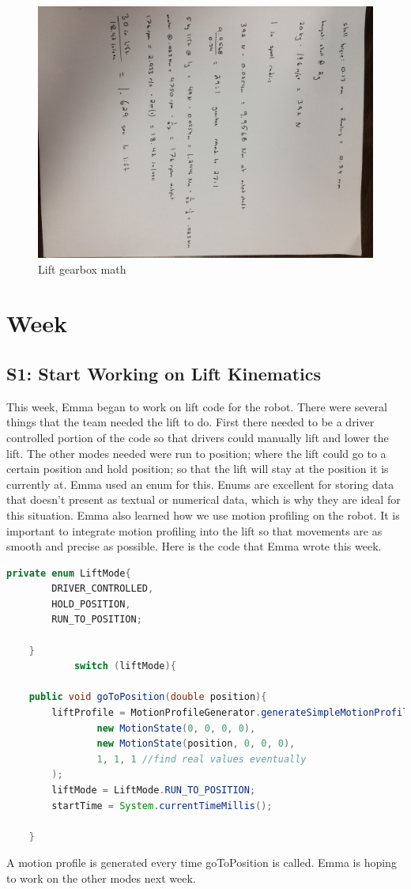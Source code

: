 \documentclass{article}
\begin{document}
\begin{figure}
    \centering
    \includegraphics[width=\textwidth, angle=90]{04_09-24/images/math.jpg}
    \caption{Lift gearbox math}
    \label{fig:my_label}
\end{figure}
\clearpage \newpage \section{Week \thesection} 
\subsection{S1: Start Working on Lift Kinematics}

This week, Emma began to work on lift code for the robot. There were several things that the team needed the lift to do. First there needed to be a driver controlled portion of the code so that drivers could manually lift and lower the lift. The other modes needed were run to position; where the lift could go to a certain position and hold position; so that the lift will stay at the position it is currently at. Emma used an enum for this. Enums are excellent for storing data that doesn't present as textual or numerical data, which is why they are ideal for this situation. Emma also learned how we use motion profiling on the robot. It is important to integrate motion profiling into the lift so that movements are as smooth and precise as possible. Here is the code that Emma wrote this week.
\begin{lstlisting}[language=Java]
    private enum LiftMode{
        DRIVER_CONTROLLED,
        HOLD_POSITION,
        RUN_TO_POSITION;

    }
            switch (liftMode){

    public void goToPosition(double position){
        liftProfile = MotionProfileGenerator.generateSimpleMotionProfile(
                new MotionState(0, 0, 0, 0),
                new MotionState(position, 0, 0, 0),
                1, 1, 1 //find real values eventually
        );
        liftMode = LiftMode.RUN_TO_POSITION;
        startTime = System.currentTimeMillis();

    }
\end{lstlisting}
A motion profile is generated every time goToPosition is called. Emma is hoping to work on the other modes next week.
\end{document}
